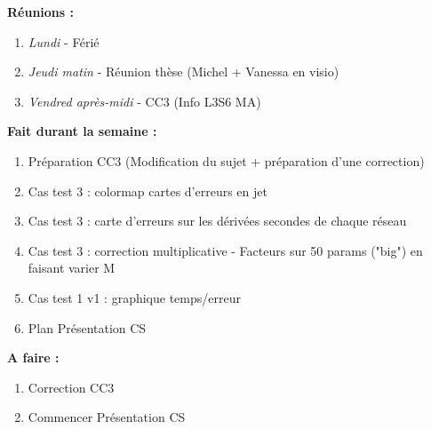 \textbf{Réunions :}
\begin{enumerate}[label=\textbullet]
	\item \textit{Lundi} - Férié
	\item \textit{Jeudi matin} - Réunion thèse (Michel + Vanessa en visio)
	\item \textit{Vendred après-midi} - CC3 (Info L3S6 MA)
\end{enumerate}
\textbf{Fait durant la semaine :}
\begin{enumerate}[label=\textbullet]
	\item Préparation CC3 (Modification du sujet + préparation d'une correction)
	\item Cas test 3 : colormap cartes d'erreurs en jet
	\item Cas test 3 : carte d'erreurs sur les dérivées secondes de chaque réseau
	\item Cas test 3 : correction multiplicative - Facteurs sur 50 params ("big") en faisant varier M
	\item Cas test 1 v1 : graphique temps/erreur
	\item Plan Présentation CS
\end{enumerate}
\textbf{A faire :}
\begin{enumerate}[label=\textbullet]
	\item Correction CC3
	\item Commencer Présentation CS
\end{enumerate}